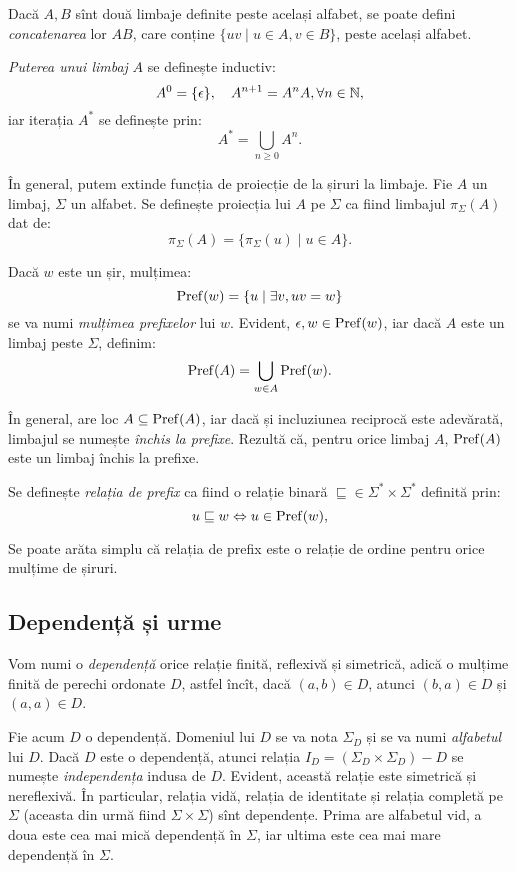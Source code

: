 Dacă $ A, B $ sînt două limbaje definite peste același alfabet,
se poate defini \emph{concatenarea} lor $ AB $, care conține
$ \{ uv \mid u \in A, v \in B \} $, peste același alfabet.

\emph{Puterea unui limbaj} $ A $ se definește inductiv:
\[
    A^0 = \{ \epsilon \}, \quad A^{n+1} = A^n A, \forall n \in \mathbb{N},
\]
iar iterația $ A^\ast $ se definește prin:
\[
    A^\ast = \bigcup_{n \geq 0} A^n.
\]

În general, putem extinde funcția de proiecție de la șiruri
la limbaje. Fie $ A $ un limbaj, $ \Sigma $ un alfabet. Se definește
proiecția lui $ A $ pe $ \Sigma $ ca fiind limbajul $ \pi_\Sigma(A) $
dat de:
\[
    \pi_\Sigma(A) = \{ \pi_\Sigma(u) \mid u \in A \}.
\]

Dacă $ w $ este un șir, mulțimea:
\[
    \mathrm{Pref}(w) = \{ u \mid \exists v, uv = w \}
\]
se va numi \emph{mulțimea prefixelor} lui $ w $. Evident,
$ \epsilon, w \in \mathrm{Pref}(w) $, iar dacă $ A $ este un limbaj
peste $ \Sigma $, definim:
\[
    \mathrm{Pref}(A) = \bigcup_{w \in A} \mathrm{Pref}(w).
\]

În general, are loc $ A \subseteq \mathrm{Pref}(A) $, iar dacă și incluziunea
reciprocă este adevărată, limbajul se numește \emph{închis la prefixe}.
Rezultă că, pentru orice limbaj $ A $, $ \mathrm{Pref}(A) $ este un limbaj
închis la prefixe.

Se definește \emph{relația de prefix} ca fiind o relație binară
$ \sqsubseteq {} \in \Sigma^\ast \times \Sigma^\ast $ definită prin:
\[
    u \sqsubseteq w \Leftrightarrow u \in \mathrm{Pref}(w),
\]

Se poate arăta simplu că relația de prefix este o relație de ordine
pentru orice mulțime de șiruri.

\subsection{Dependență și urme}

Vom numi o \emph{dependență} orice relație finită, reflexivă și simetrică,
adică o mulțime finită de perechi ordonate $ D $, astfel încît, dacă
$ (a, b) \in D $, atunci $ (b,a) \in D $ și $ (a, a) \in D $.

Fie acum $ D $ o dependență. Domeniul lui $ D $ se va nota $ \Sigma_D $
și se va numi \emph{alfabetul} lui $ D $. Dacă $ D $ este o dependență,
atunci relația $ I_D = (\Sigma_D \times \Sigma_D) - D $ se numește
\emph{independența} indusa de $ D $. Evident, această relație este
simetrică și nereflexivă. În particular, relația vidă, relația de
identitate și relația completă pe $ \Sigma $ (aceasta din urmă fiind
$ \Sigma \times \Sigma $) sînt dependențe. Prima are alfabetul vid,
a doua este cea mai mică dependență în $ \Sigma $, iar ultima este
cea mai mare dependență în $ \Sigma $.

